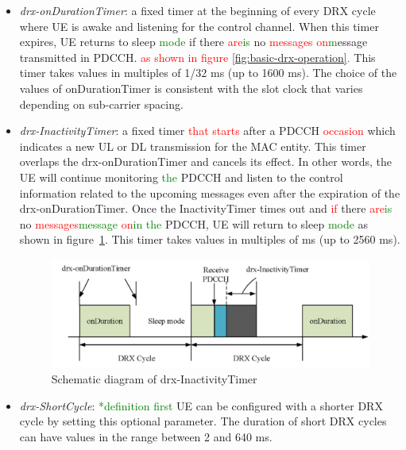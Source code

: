 \documentclass[]{IEEEtran}
\newcommand{\CAREPL}[2]{\textcolor{red}{#1}\textcolor{green}{#2}}
\begin{document}
\begin{itemize}
    \item \textit{drx-onDurationTimer}: a fixed timer at the beginning of every DRX cycle where UE is awake and listening for the control channel.
    When this timer expires, UE returns to sleep \CAREPL{}{mode} if there \CAREPL{are}{is} no \CAREPL{messages on} message transmitted in PDCCH. 
    \CAREPL{as shown in figure \ref{fig:basic-drx-operation}.}{} 
    This timer takes values in multiples of 1/32 ms (up to 1600 ms). The choice of the values of onDurationTimer is consistent with the slot clock that varies depending on sub-carrier spacing.
    \item \textit{drx-InactivityTimer}: a fixed timer \CAREPL{that starts}{} after a PDCCH \CAREPL{occasion}{} which indicates a new UL or DL transmission for the MAC entity. This timer overlaps the drx-onDurationTimer and cancels its effect. 
    In other words, the UE will continue monitoring \CAREPL{}{the} PDCCH and listen to the control information related to the upcoming messages even after the expiration of the drx-onDurationTimer. 
    Once the InactivityTimer times out and \CAREPL{if}{} there \CAREPL{are}{is} no \CAREPL{messages}{message} \CAREPL{on}{in the} PDCCH, UE will return to sleep \CAREPL{}{mode} as shown in figure~\ref{fig:5g-drx-InactivityTimer}. This timer takes values in multiples of ms (up to 2560 ms).
\begin{figure}
    \centering
    \includegraphics[width=\linewidth]{Pictures/Schematic diagram of drx-InactivityTimer.png}
    \caption{Schematic diagram of drx-InactivityTimer}
    \label{fig:5g-drx-InactivityTimer}
\end{figure}

    \item \textit{drx-ShortCycle}: \CAREPL{}{*definition first} UE can be configured with a shorter DRX cycle by setting this optional parameter. The duration of short DRX cycles can have values in the range between 2 and 640 ms.
    

\end{itemize}
\end{document}
